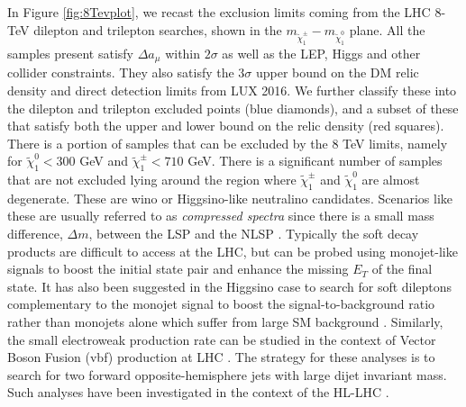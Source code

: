 In Figure \ref{fig:8Tevplot}, we recast the exclusion limits coming from the LHC 8-TeV dilepton and trilepton searches, shown in the $m_{\tilde{\chi}^{\pm}_1} - m_{\tilde{\chi}^{0}_1}$ plane. All the samples present satisfy $\Delta a_{\mu}$ within $2\sigma$ as well as the LEP, Higgs and other collider constraints. They also satisfy the $3\sigma$ upper bound on the DM relic density and direct detection limits from LUX 2016. We further classify these into the dilepton and trilepton excluded points (blue diamonds), and a subset of these that satisfy both the upper and lower bound on the relic density (red squares). There is a portion of samples that can be excluded by the 8 TeV limits, namely for $\tilde{\chi}^{0}_1<300$ GeV and $\tilde{\chi}^{\pm}_1<710$ GeV. There is a significant number of samples that are not excluded lying around the region where $\tilde{\chi}^{\pm}_1$ and $\tilde{\chi}^{0}_1$ are almost degenerate. These are wino or Higgsino-like neutralino candidates. Scenarios like these are usually referred to as \textit{compressed spectra} since there is a small mass difference, $\Delta m$, between the LSP and the NLSP \cite{RN186}. Typically the soft decay products are difficult to access at the LHC, but can be probed using monojet-like signals to boost the initial state pair and enhance the missing $E_T$ of the final state. It has also been suggested in the Higgsino case to search for soft dileptons complementary to the monojet signal to boost the signal-to-background ratio rather than monojets alone which suffer from large SM background \cite{RN902,RN901,RN900}. Similarly, the small electroweak production rate can be studied in the context of Vector Boson Fusion (\acrshort{vbf}) production at LHC \cite{RN644}. The strategy for these analyses is to search for two forward opposite-hemisphere jets with large dijet invariant mass. Such analyses have been investigated in the context of the HL-LHC \cite{RN186,RN309,RN187,RN188,RN189,RN190,RN191}.
  
